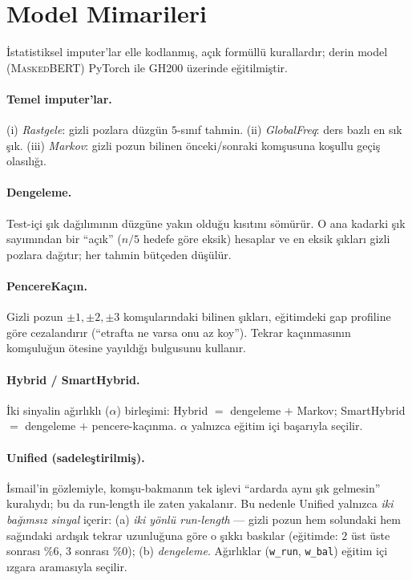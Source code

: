 \documentclass[11pt]{article}
\begin{document}
\section{Model Mimarileri}
İstatistiksel imputer'lar elle kodlanmış, açık formüllü kurallardır; derin
model (\textsc{MaskedBERT}) PyTorch ile GH200 üzerinde eğitilmiştir.

\paragraph{Temel imputer'lar.} (i) \emph{Rastgele}: gizli pozlara düzgün
$5$-sınıf tahmin. (ii) \emph{GlobalFreq}: ders bazlı en sık şık. (iii)
\emph{Markov}: gizli pozun bilinen önceki/sonraki komşusuna koşullu geçiş
olasılığı.

\paragraph{Dengeleme.} Test-içi şık dağılımının düzgüne yakın olduğu kısıtını
sömürür. O ana kadarki şık sayımından bir ``açık'' ($n/5$ hedefe göre eksik)
hesaplar ve en eksik şıkları gizli pozlara dağıtır; her tahmin bütçeden
düşülür.

\paragraph{PencereKaçın.} Gizli pozun $\pm 1, \pm 2, \pm 3$ komşularındaki
bilinen şıkları, eğitimdeki gap profiline göre cezalandırır (``etrafta ne
varsa onu az koy''). Tekrar kaçınmasının komşuluğun ötesine yayıldığı bulgusunu
kullanır.

\paragraph{Hybrid / SmartHybrid.} İki sinyalin ağırlıklı ($\alpha$)
birleşimi: Hybrid $=$ dengeleme $+$ Markov; SmartHybrid $=$ dengeleme $+$
pencere-kaçınma. $\alpha$ yalnızca eğitim içi başarıyla seçilir.

\paragraph{Unified (sadeleştirilmiş).} İsmail'in gözlemiyle, komşu-bakmanın
tek işlevi ``ardarda aynı şık gelmesin'' kuralıydı; bu da run-length ile
zaten yakalanır. Bu nedenle Unified yalnızca \emph{iki bağımsız sinyal}
içerir: (a) \emph{iki yönlü run-length} --- gizli pozun hem solundaki hem
sağındaki ardışık tekrar uzunluğuna göre o şıkkı baskılar (eğitimde:
$2$ üst üste sonrası $\%6$, $3$ sonrası $\%0$); (b) \emph{dengeleme}.
Ağırlıklar (\texttt{w\_run}, \texttt{w\_bal}) eğitim içi ızgara aramasıyla
seçilir.
\end{document}
